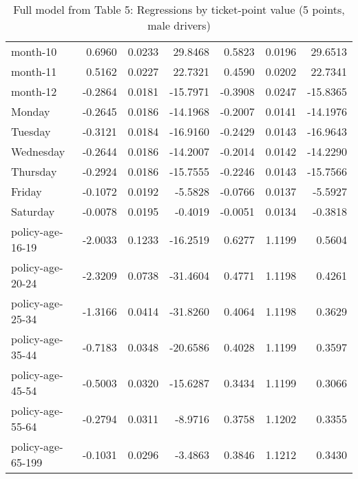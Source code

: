 \documentclass[10pt]{article}
\begin{document}
\begin{table}[ht]
\begin{tabular}{lrrrrrr}
  month-10 & 0.6960 & 0.0233 & 29.8468 & 0.5823 & 0.0196 & 29.6513 \\ 
  month-11 & 0.5162 & 0.0227 & 22.7321 & 0.4590 & 0.0202 & 22.7341 \\ 
  month-12 & -0.2864 & 0.0181 & -15.7971 & -0.3908 & 0.0247 & -15.8365 \\ 
  Monday & -0.2645 & 0.0186 & -14.1968 & -0.2007 & 0.0141 & -14.1976 \\ 
  Tuesday & -0.3121 & 0.0184 & -16.9160 & -0.2429 & 0.0143 & -16.9643 \\ 
  Wednesday & -0.2644 & 0.0186 & -14.2007 & -0.2014 & 0.0142 & -14.2290 \\ 
  Thursday & -0.2924 & 0.0186 & -15.7555 & -0.2246 & 0.0143 & -15.7566 \\ 
  Friday & -0.1072 & 0.0192 & -5.5828 & -0.0766 & 0.0137 & -5.5927 \\ 
  Saturday & -0.0078 & 0.0195 & -0.4019 & -0.0051 & 0.0134 & -0.3818 \\ 
  policy-age-16-19 & -2.0033 & 0.1233 & -16.2519 & 0.6277 & 1.1199 & 0.5604 \\ 
  policy-age-20-24 & -2.3209 & 0.0738 & -31.4604 & 0.4771 & 1.1198 & 0.4261 \\ 
  policy-age-25-34 & -1.3166 & 0.0414 & -31.8260 & 0.4064 & 1.1198 & 0.3629 \\ 
  policy-age-35-44 & -0.7183 & 0.0348 & -20.6586 & 0.4028 & 1.1199 & 0.3597 \\ 
  policy-age-45-54 & -0.5003 & 0.0320 & -15.6287 & 0.3434 & 1.1199 & 0.3066 \\ 
  policy-age-55-64 & -0.2794 & 0.0311 & -8.9716 & 0.3758 & 1.1202 & 0.3355 \\ 
  policy-age-65-199 & -0.1031 & 0.0296 & -3.4863 & 0.3846 & 1.1212 & 0.3430 \\ 
   \hline
\end{tabular}
\caption{Full model from Table 5: Regressions by ticket-point value (5 points, male drivers)} 
\label{tab_5_5_pts_M}
\end{table}


\clearpage
\pagebreak



\end{document}
